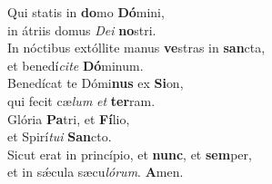 \evenverse Qui statis in \textbf{do}mo \textbf{Dó}mini,~\*\\
\evenverse in átriis domus \textit{De}\textit{i} \textbf{no}stri.\\
\oddverse In nóctibus extóllite manus \textbf{ve}stras in \textbf{san}cta,~\*\\
\oddverse et benedí\textit{ci}\textit{te} \textbf{Dó}minum.\\
\evenverse Benedícat te Dómi\textbf{nus} ex \textbf{Si}on,~\*\\
\evenverse qui fecit cæ\textit{lum} \textit{et} \textbf{ter}ram.\\
\oddverse Glória \textbf{Pa}tri, et \textbf{Fí}lio,~\*\\
\oddverse et Spirí\textit{tu}\textit{i} \textbf{San}cto.\\
\evenverse Sicut erat in princípio, et \textbf{nunc}, et \textbf{sem}per,~\*\\
\evenverse et in sǽcula sæcu\textit{ló}\textit{rum}. \textbf{A}men.\\
